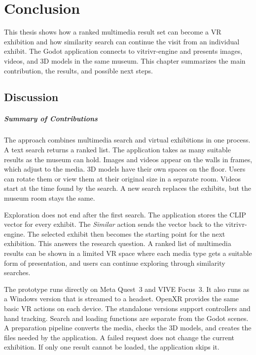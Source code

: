 \chapter{Conclusion}
\label{ch:conclusion}

\begingroup
\setaftersecskip{6pt}
\setlength{\emergencystretch}{2em}

This thesis shows how a ranked multimedia result set can become a VR exhibition and how similarity search can continue the visit from an individual exhibit. The Godot application connects to vitrivr-engine and presents images, videos, and 3D models in the same museum. This chapter summarizes the main contribution, the results, and possible next steps.

\section{Discussion}

\paragraph{Summary of Contributions}
The approach combines multimedia search and virtual exhibitions in one process. A text search returns a ranked list. The application takes as many suitable results as the museum can hold. Images and videos appear on the walls in frames, which adjust to the media. 3D models have their own spaces on the floor. Users can rotate them or view them at their original size in a separate room. Videos start at the time found by the search. A new search replaces the exhibits, but the museum room stays the same.

Exploration does not end after the first search. The application stores the CLIP vector for every exhibit. The \emph{Similar} action sends the vector back to the vitrivr-engine. The selected exhibit then becomes the starting point for the next exhibition. This answers the research question. A ranked list of multimedia results can be shown in a limited VR space where each media type gets a suitable form of presentation, and users can continue exploring through similarity searches.

The prototype runs directly on Meta Quest~3 and VIVE Focus~3. It also runs as a Windows version that is streamed to a headset. OpenXR provides the same basic VR actions on each device. The standalone versions support controllers and hand tracking. Search and loading functions are separate from the Godot scenes. A preparation pipeline converts the media, checks the 3D models, and creates the files needed by the application. A failed request does not change the current exhibition. If only one result cannot be loaded, the application skips it.

